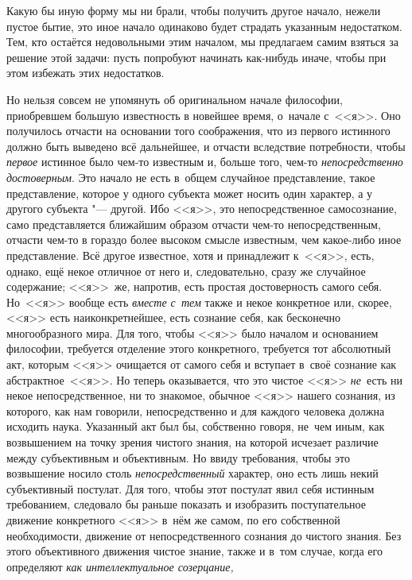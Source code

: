 Какую бы иную форму мы ни брали, чтобы получить другое начало, нежели пустое
бытие, это иное начало одинаково будет страдать указанным недостатком.
Тем, кто остаётся недовольными этим началом, мы предлагаем самим взяться
за решение этой задачи: пусть попробуют начинать как-нибудь иначе, чтобы
при этом избежать этих недостатков.

Но нельзя совсем не упомянуть об оригинальном начале философии, приобревшем
большую известность в новейшее время, о~начале с~<<я>>. Оно получилось отчасти на основании того соображения,
что из первого истинного должно быть выведено всё дальнейшее, и отчасти
вследствие потребности, чтобы {\em первое} истинное было чем-то известным и,
больше того, чем-то {\em непосредственно достоверным}. Это начало не есть
в~общем случайное представление, такое представление, которое у одного субъекта
может носить один характер, а у другого субъекта "--- другой. Ибо <<я>>, это
непосредственное самосознание, само представляется ближайшим образом отчасти
чем-то непосредственным, отчасти чем-то в гораздо более высоком смысле
известным, чем какое-либо иное представление. Всё другое известное, хотя и
принадлежит к~<<я>>, есть, однако, ещё некое отличное от него и, следовательно,
сразу же случайное содержание; <<я>>~же, напротив, есть простая достоверность
самого себя. Но~<<я>> вообще есть {\em вместе с~тем} также и некое конкретное
или, скорее, <<я>> есть наиконкретнейшее, есть сознание себя, как бесконечно
многообразного мира. Для того, чтобы <<я>> было началом и основанием философии,
требуется отделение этого конкретного, требуется тот абсолютный акт, которым
<<я>> очищается от самого себя и вступает в~своё сознание как
абстрактное~<<я>>. Но теперь оказывается, что это чистое <<я>> {\em не}~есть ни некое
непосредственное, ни то знакомое, обычное <<я>> нашего сознания, из которого,
как нам говорили, непосредственно и для каждого человека должна исходить наука.
Указанный акт был бы, собственно говоря, не~чем иным, как возвышением на точку
зрения чистого знания, на которой исчезает различие между субъективным и
объективным. Но ввиду требования, чтобы это возвышение носило столь
{\em непосредственный} характер, оно есть лишь некий субъективный постулат. Для
того, чтобы этот постулат явил себя истинным требованием, следовало бы раньше
показать и изобразить поступательное движение конкретного <<я>> в~нём же самом,
по его собственной необходимости, движение от непосредственного сознания до
чистого знания. Без этого объективного движения чистое знание, также и в~том
случае, когда его определяют {\em как интеллектуальное созерцание,}
